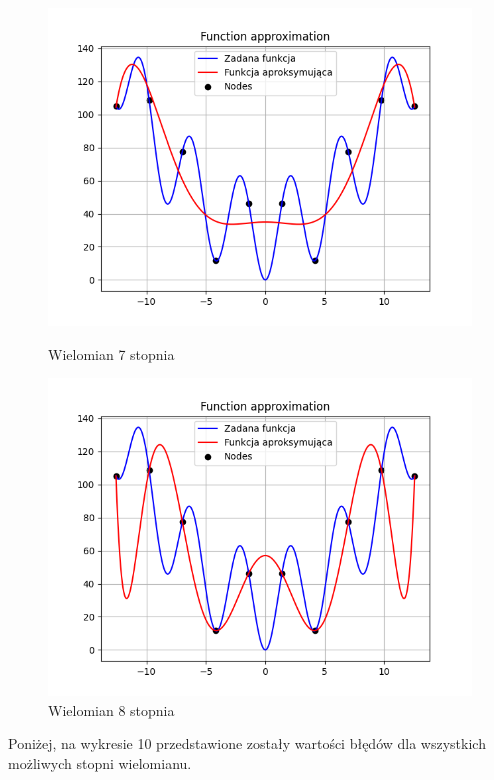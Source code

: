 \documentclass{article}
\begin{document}
\begin{figure}[H]
\begin{minipage}[b]{0.49\textwidth}
    \begin{minipage}[b]{\textwidth}
      \includegraphics[width=\textwidth]{img08.png}
      \caption{Wielomian 7 stopnia}
    \end{minipage}
    \vspace*{\fill}
    \begin{minipage}[b]{\textwidth}
      \includegraphics[width=\textwidth]{img09.png}
      \caption{Wielomian 8 stopnia}
    \end{minipage}
  \end{minipage}
\end{figure}

Poniżej, na wykresie 10 przedstawione zostały wartości błędów dla wszystkich możliwych stopni wielomianu.
\end{document}
